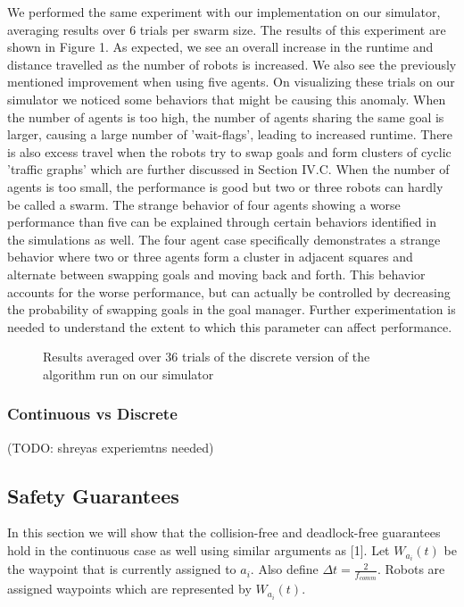 We performed the same experiment with our implementation on our simulator, averaging results over 6 trials per swarm size. The results of this experiment are shown in Figure 1. As expected, we see an overall increase in the runtime and distance travelled as the number of robots is increased. We also see the previously mentioned improvement when using five agents. On visualizing these trials on our simulator we noticed some behaviors that might be causing this anomaly. When the number of agents is too high, the number of agents sharing the same goal is larger, causing a large number of 'wait-flags', leading to increased runtime. There is also excess travel when the robots try to swap goals and form clusters of cyclic 'traffic graphs' which are further discussed in Section IV.C. When the number of agents is too small, the performance is good but two or three robots can hardly be called a swarm. The strange behavior of four agents showing a worse performance than five can be explained through certain behaviors identified in the simulations as well. The four agent case specifically demonstrates a strange behavior where two or three agents form a cluster in adjacent squares and alternate between swapping goals and moving back and forth. This behavior accounts for the worse performance, but can actually be controlled by decreasing the probability of swapping goals in the goal manager. Further experimentation is needed to understand the extent to which this parameter can affect performance. 

\begin{figure}%
    \centering
    \qquad
    \caption{Results averaged over 36 trials of the discrete version of the algorithm run on our simulator}%
    \label{fig:example}%
\end{figure}

\subsubsection{Continuous vs Discrete}
(TODO: shreyas experiemtns needed) 

\subsection{Safety Guarantees}

In this section we will show that the collision-free and deadlock-free guarantees hold in the continuous case as well using similar arguments as [1]. Let $W_{a_i}(t)$ be the waypoint that is currently assigned to $a_i$. Also define $\Delta t = \frac{2}{f_{comm}}$. Robots are assigned waypoints which are represented by $W_{a_i}(t)$.



